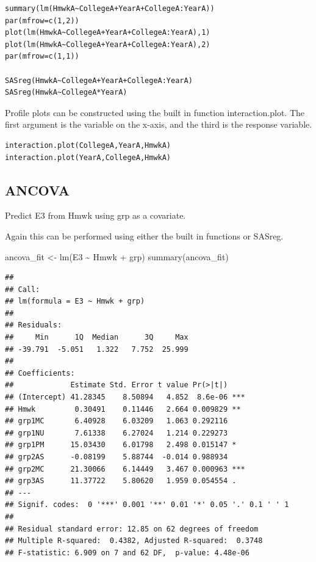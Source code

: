 \documentclass[
]{book}
\newenvironment{Shaded}{\begin{snugshade}}{\end{snugshade}}
\newcommand{\FunctionTok}[1]{\textcolor[rgb]{0.00,0.00,0.00}{#1}}
\newcommand{\NormalTok}[1]{#1}
\newcommand{\OtherTok}[1]{\textcolor[rgb]{0.56,0.35,0.01}{#1}}
\newcommand{\SpecialCharTok}[1]{\textcolor[rgb]{0.00,0.00,0.00}{#1}}
\begin{document}
\begin{verbatim}
summary(lm(HmwkA~CollegeA+YearA+CollegeA:YearA))
par(mfrow=c(1,2))
plot(lm(HmwkA~CollegeA+YearA+CollegeA:YearA),1)
plot(lm(HmwkA~CollegeA+YearA+CollegeA:YearA),2)
par(mfrow=c(1,1))

SASreg(HmwkA~CollegeA+YearA+CollegeA:YearA)
SASreg(HmwkA~CollegeA*YearA)
\end{verbatim}

Profile plots can be constructed using the built in function interaction.plot. The first argument is the variable on the x-axis, and the third is the response variable.

\begin{verbatim}
interaction.plot(CollegeA,YearA,HmwkA)
interaction.plot(YearA,CollegeA,HmwkA)
\end{verbatim}

\hypertarget{ancova}{%
\subsection{ANCOVA}\label{ancova}}

Predict E3 from Hmwk using grp as a covariate.

Again this can be performed using either the built in functions or SASreg.

\begin{Shaded}
\begin{Highlighting}[]
\NormalTok{ancova\_fit }\OtherTok{\textless{}{-}} \FunctionTok{lm}\NormalTok{(E3 }\SpecialCharTok{\textasciitilde{}}\NormalTok{ Hmwk }\SpecialCharTok{+}\NormalTok{ grp)}
\FunctionTok{summary}\NormalTok{(ancova\_fit)}
\end{Highlighting}
\end{Shaded}

\begin{verbatim}
## 
## Call:
## lm(formula = E3 ~ Hmwk + grp)
## 
## Residuals:
##     Min      1Q  Median      3Q     Max 
## -39.791  -5.051   1.322   7.752  25.999 
## 
## Coefficients:
##             Estimate Std. Error t value Pr(>|t|)    
## (Intercept) 41.28345    8.50894   4.852  8.6e-06 ***
## Hmwk         0.30491    0.11446   2.664 0.009829 ** 
## grp1MC       6.40928    6.03209   1.063 0.292116    
## grp1NU       7.61338    6.27024   1.214 0.229273    
## grp1PM      15.03430    6.01798   2.498 0.015147 *  
## grp2AS      -0.08199    5.88744  -0.014 0.988934    
## grp2MC      21.30066    6.14449   3.467 0.000963 ***
## grp3AS      11.37722    5.80620   1.959 0.054554 .  
## ---
## Signif. codes:  0 '***' 0.001 '**' 0.01 '*' 0.05 '.' 0.1 ' ' 1
## 
## Residual standard error: 12.85 on 62 degrees of freedom
## Multiple R-squared:  0.4382, Adjusted R-squared:  0.3748 
## F-statistic: 6.909 on 7 and 62 DF,  p-value: 4.48e-06
\end{verbatim}
\end{document}
